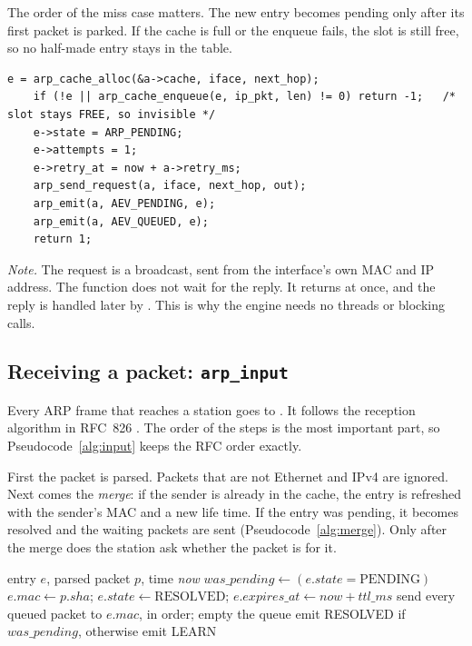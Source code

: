 The order of the miss case matters. The new entry becomes pending only after its first packet is parked. If the cache is full or the enqueue fails, the slot is still free, so no half-made entry stays in the table.

\begin{lstlisting}[style=corelst, firstnumber=57, caption={\code{src/arp.c}, lines 57--65: the miss path of \code{arp\_output}.}]
    e = arp_cache_alloc(&a->cache, iface, next_hop);
    if (!e || arp_cache_enqueue(e, ip_pkt, len) != 0) return -1;   /* slot stays FREE, so invisible */
    e->state = ARP_PENDING;
    e->attempts = 1;
    e->retry_at = now + a->retry_ms;
    arp_send_request(a, iface, next_hop, out);
    arp_emit(a, AEV_PENDING, e);
    arp_emit(a, AEV_QUEUED, e);
    return 1;
\end{lstlisting}

\emph{Note.} The request is a broadcast, sent from the interface's own MAC and IP address. The function does not wait for the reply. It returns at once, and the reply is handled later by . This is why the engine needs no threads or blocking calls.

\subsection{Receiving a packet: \texttt{arp\_input}}\label{sec:core-input}
Every ARP frame that reaches a station goes to . It follows the reception algorithm in RFC~826 \cite{rfc826}. The order of the steps is the most important part, so Pseudocode~\ref{alg:input} keeps the RFC order exactly.

First the packet is parsed. Packets that are not Ethernet and IPv4 are ignored. Next comes the \emph{merge}: if the sender is already in the cache, the entry is refreshed with the sender's MAC and a new life time. If the entry was pending, it becomes resolved and the waiting packets are sent (Pseudocode~\ref{alg:merge}). Only after the merge does the station ask whether the packet is for it.

\begin{algorithm}[H]\small
\caption{Refresh a known sender ()}
\label{alg:merge}
\begin{algorithmic}[1]
\Require entry $e$, parsed packet $p$, time \textit{now}
\State $was\_pending \gets (e.state = \text{PENDING})$
\State $e.mac \gets p.sha$; $e.state \gets \text{RESOLVED}$; $e.expires\_at \gets now + ttl\_ms$
  \State send every queued packet to $e.mac$, in order; empty the queue
\EndIf
\State emit RESOLVED if $was\_pending$, otherwise emit LEARN
\end{algorithmic}
\end{algorithm}


